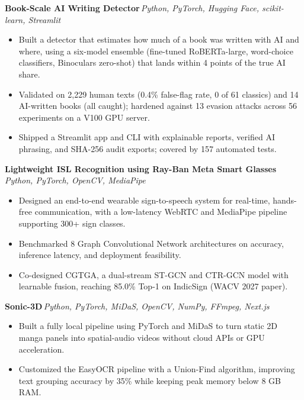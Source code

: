 \documentclass[11pt,letterpaper]{article}
\newcommand{\entry}[2]{%
  \vspace{1pt}\noindent\textbf{#1}\hfill\textit{\small #2}\par\nopagebreak\vspace{1pt}%
}
\newcommand{\gh}[1]{\,\href{#1}{\makebox[1.5em][l]{\normalfont\small\faGithub}}}
\begin{document}
\entry{Book-Scale AI Writing Detector\gh{https://github.com/AkankshaGupta259}}{Python, PyTorch, Hugging Face, scikit-learn, Streamlit}
\begin{itemize}
  \item Built a detector that estimates how much of a book was written with AI and where, using a six-model ensemble (fine-tuned RoBERTa-large, word-choice classifiers, Binoculars zero-shot) that lands within 4 points of the true AI share.
  \item Validated on 2,229 human texts (0.4\% false-flag rate, 0 of 61 classics) and 14 AI-written books (all caught); hardened against 13 evasion attacks across 56 experiments on a V100 GPU server.
  \item Shipped a Streamlit app and CLI with explainable reports, verified AI phrasing, and SHA-256 audit exports; covered by 157 automated tests.
\end{itemize}

\entry{Lightweight ISL Recognition using Ray-Ban Meta Smart Glasses\gh{https://github.com/AkankshaGupta259/Lightweight-ISL-Recognition-System}}{Python, PyTorch, OpenCV, MediaPipe}
\begin{itemize}
  \item Designed an end-to-end wearable sign-to-speech system for real-time, hands-free communication, with a low-latency WebRTC and MediaPipe pipeline supporting 300+ sign classes.
  \item Benchmarked 8 Graph Convolutional Network architectures on accuracy, inference latency, and deployment feasibility.
  \item Co-designed CGTGA, a dual-stream ST-GCN and CTR-GCN model with learnable fusion, reaching 85.0\% Top-1 on IndicSign (WACV 2027 paper).
\end{itemize}

\entry{Sonic-3D\gh{https://github.com/AkankshaGupta259/Sonic-3D}}{Python, PyTorch, MiDaS, OpenCV, NumPy, FFmpeg, Next.js}
\begin{itemize}
  \item Built a fully local pipeline using PyTorch and MiDaS to turn static 2D manga panels into spatial-audio videos without cloud APIs or GPU acceleration.
  \item Customized the EasyOCR pipeline with a Union-Find algorithm, improving text grouping accuracy by 35\% while keeping peak memory below 8 GB RAM.
\end{itemize}

\end{document}
